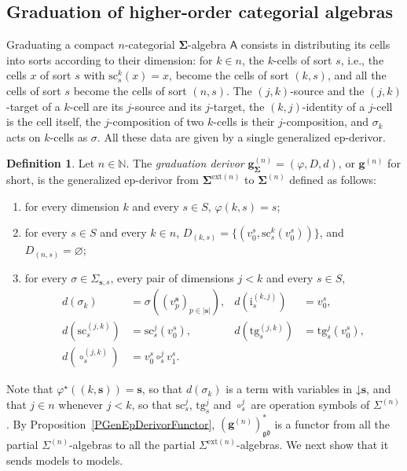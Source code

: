 \documentclass{amsart}
\newcommand{\bb}[1]{\ensuremath{\lvert #1 \rvert}}
\newcommand{\vs}[1]{\mathbin{\downarrow}#1}
\theoremstyle{plain}
\theoremstyle{definition}
\newtheorem{definition}[theorem]{Definition}
\begin{document}
\subsection{Graduation of higher-order categorial algebras}\label{SGraduationSub}

Graduating a compact $n$-categorial $\mathbf{\Sigma}$-algebra $\boldsymbol{\mathsf{A}}$ consists in distributing its cells into sorts according to their dimension: for $k\in n$, the $k$-cells of sort $s$, i.e., the cells $x$ of sort $s$ with $\mathrm{sc}^{k}_{s}(x)=x$, become the cells of sort $(k,s)$, and all the cells of sort $s$ become the cells of sort $(n,s)$. The $(j,k)$-source and the $(j,k)$-target of a $k$-cell are its $j$-source and its $j$-target, the $(k,j)$-identity of a $j$-cell is the cell itself, the $j$-composition of two $k$-cells is their $j$-composition, and $\sigma_{k}$ acts on $k$-cells as $\sigma$. All these data are given by a single generalized ep-derivor.

\begin{definition}\label{DGradDerivor}
Let $n\in\mathbb{N}$. The \emph{graduation derivor} $\mathbf{g}^{(n)}_{\mathbf{\Sigma}}=(\varphi,D,d)$, or $\mathbf{g}^{(n)}$ for short, is the generalized ep-derivor from $\mathbf{\Sigma}^{\mathrm{ext}(n)}$ to $\mathbf{\Sigma}^{(n)}$ defined as follows:
\begin{enumerate}
\item for every dimension $k$ and every $s\in S$, $\varphi(k,s)=s$;
\item for every $s\in S$ and every $k\in n$, $D_{(k,s)}=\{(v^{s}_{0},\mathrm{sc}^{k}_{s}(v^{s}_{0}))\}$, and $D_{(n,s)}=\varnothing$;
\item for every $\sigma\in\Sigma_{\mathbf{s},s}$, every pair of dimensions $j<k$ and every $s\in S$,
\begin{align*}
d(\sigma_{k})&=\sigma((v^{\mathbf{s}}_{p})_{p\in\bb{\mathbf{s}}}), &
d(\mathrm{i}^{(k,j)}_{s})&=v^{s}_{0},\\
d(\mathrm{sc}^{(j,k)}_{s})&=\mathrm{sc}^{j}_{s}(v^{s}_{0}), &
d(\mathrm{tg}^{(j,k)}_{s})&=\mathrm{tg}^{j}_{s}(v^{s}_{0}),\\
d(\circ^{(j,k)}_{s})&=v^{s}_{0}\circ^{j}_{s}v^{s}_{1}.
\end{align*}
\end{enumerate}
\end{definition}

Note that $\varphi^{\star}((k,\mathbf{s}))=\mathbf{s}$, so that $d(\sigma_{k})$ is a term with variables in $\vs{\mathbf{s}}$, and that $j\in n$ whenever $j<k$, so that $\mathrm{sc}^{j}_{s}$, $\mathrm{tg}^{j}_{s}$ and $\circ^{j}_{s}$ are operation symbols of $\Sigma^{(n)}$. By Proposition~\ref{PGenEpDerivorFunctor}, $(\mathbf{g}^{(n)})^{\ast}_{\mathfrak{gd}}$ is a functor from all the partial $\Sigma^{(n)}$-algebras to all the partial $\Sigma^{\mathrm{ext}(n)}$-algebras. We next show that it sends models to models.
\end{document}
